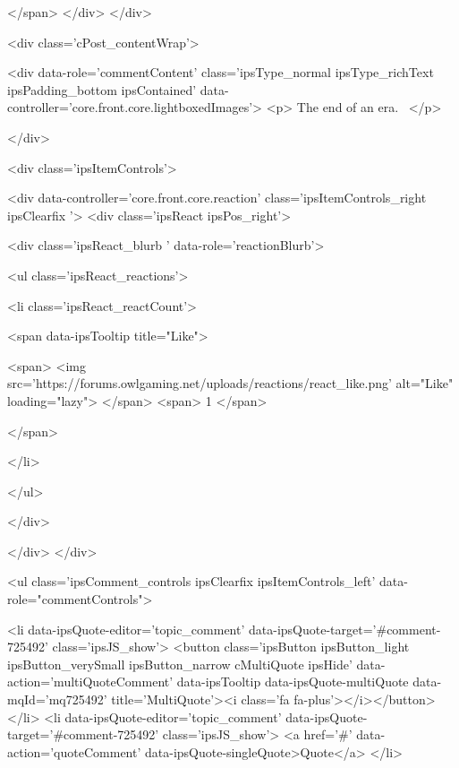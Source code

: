 				
			</span>
		</div>
	</div>

	

    

	<div class='cPost_contentWrap'>
		
		<div data-role='commentContent' class='ipsType_normal ipsType_richText ipsPadding_bottom ipsContained' data-controller='core.front.core.lightboxedImages'>
			<p>
	The end of an era. 
</p>


			
		</div>

		
			<div class='ipsItemControls'>
				
					
						

	<div data-controller='core.front.core.reaction' class='ipsItemControls_right ipsClearfix '>	
		<div class='ipsReact ipsPos_right'>
			
				
				<div class='ipsReact_blurb ' data-role='reactionBlurb'>
					
						

	
	<ul class='ipsReact_reactions'>
		
		
			
				
				<li class='ipsReact_reactCount'>
					
						<span data-ipsTooltip title="Like">
					
							<span>
								<img src='https://forums.owlgaming.net/uploads/reactions/react_like.png' alt="Like" loading="lazy">
							</span>
							<span>
								1
							</span>
					
						</span>
					
				</li>
			
		
	</ul>

					
				</div>
			
			
			
		</div>
	</div>

					
				
				<ul class='ipsComment_controls ipsClearfix ipsItemControls_left' data-role="commentControls">
					
						
							<li data-ipsQuote-editor='topic_comment' data-ipsQuote-target='#comment-725492' class='ipsJS_show'>
								<button class='ipsButton ipsButton_light ipsButton_verySmall ipsButton_narrow cMultiQuote ipsHide' data-action='multiQuoteComment' data-ipsTooltip data-ipsQuote-multiQuote data-mqId='mq725492' title='MultiQuote'><i class='fa fa-plus'></i></button>
							</li>
							<li data-ipsQuote-editor='topic_comment' data-ipsQuote-target='#comment-725492' class='ipsJS_show'>
								<a href='#' data-action='quoteComment' data-ipsQuote-singleQuote>Quote</a>
							</li>
						
